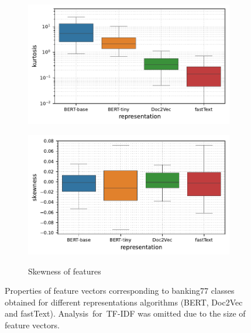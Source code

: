 \begin{figure}[t]
\begin{subfigure}[b]{0.495\textwidth}
        \includegraphics[width=\textwidth]{images/real-characteristics/text-banking77/properties-banking77-kurt(representation,representation)-representation_BERT-base,BERT-tiny,Doc2Vec,fastText-class_0,61-data_ID-train.pdf}
        \label{fig:text-banking77-curtosis}
    \end{subfigure}
    \hfill
    \begin{subfigure}[b]{0.495\textwidth}
        \centering
        \caption{\small Skewness of features}
        \includegraphics[width=\textwidth]{images/real-characteristics/text-banking77/properties-banking77-skew(representation,representation)-representation_BERT-base,BERT-tiny,Doc2Vec,fastText-class_0,61-data_ID-train.pdf}
        \label{fig:text-banking77-skewness}
    \end{subfigure}
    \caption{Properties of feature vectors corresponding to banking77 classes obtained for different representations algorithms (BERT, Doc2Vec and fastText). Analysis~for~TF-IDF was omitted due to the size of feature vectors.}
    \label{fig:characteristics-text-banking77}
\end{figure}

\cleardoublepage{}
